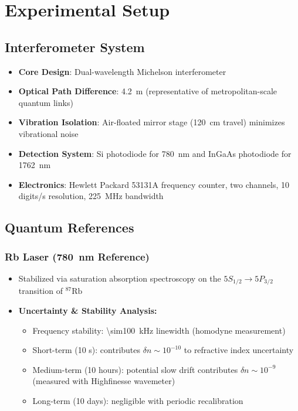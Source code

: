 \documentclass[aps,prl,reprint,groupedaddress,onecolumn,superscriptaddress]{revtex4-2}
\begin{document}
\section{Experimental Setup}


\subsection{Interferometer System}
\begin{itemize}
    \item \textbf{Core Design}: Dual-wavelength Michelson interferometer
    \item \textbf{Optical Path Difference}: \SI{4.2}{\meter} (representative of metropolitan-scale quantum links)
    \item \textbf{Vibration Isolation}: Air-floated mirror stage (\SI{120}{\centi\meter} travel) minimizes vibrational noise
    \item \textbf{Detection System}: Si photodiode for \SI{780}{\nano\meter} and InGaAs photodiode for \SI{1762}{\nano\meter}
    \item \textbf{Electronics}: Hewlett Packard 53131A frequency counter, two channels, 10 digits/s resolution, \SI{225}{\mega\hertz} bandwidth
\end{itemize}

\subsection{Quantum References}

\subsubsection{Rb Laser (\SI{780}{\nano\meter} Reference)}
\begin{itemize}
    \item Stabilized via saturation absorption spectroscopy on the $5S_{1/2} \rightarrow 5P_{3/2}$ transition of $^{87}\text{Rb}$
    \item \textbf{Uncertainty \& Stability Analysis:}
    \begin{itemize}
        \item Frequency stability: \SI{\sim100}{\kilo\hertz} linewidth (homodyne measurement\cite{ludvigsen1998laser})
        \item Short-term (10 s): contributes $\delta n \sim 10^{-10}$ to refractive index uncertainty
        \item Medium-term (10 hours): potential slow drift contributes $\delta n \sim 10^{-9}$ (measured with Highfinesse wavemeter)
        \item Long-term (10 days): negligible with periodic recalibration
    \end{itemize}
\end{itemize}
\end{document}
